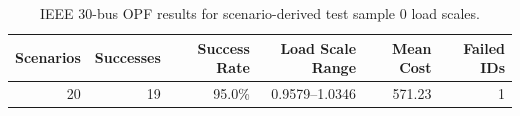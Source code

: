 \begin{table}[t]
  \centering
  \caption{IEEE 30-bus OPF results for scenario-derived test sample 0 load scales.}
  \label{tab:case30_scenario_dispatch}
  \begin{tabular}{rrrrrr}
    \toprule
    \textbf{Scenarios} & \textbf{Successes} & \textbf{Success Rate} & \textbf{Load Scale Range} & \textbf{Mean Cost} & \textbf{Failed IDs} \\
    \midrule
    20 & 19 & 95.0\% & 0.9579--1.0346 & 571.23 & 1 \\
    \bottomrule
  \end{tabular}
\end{table}
